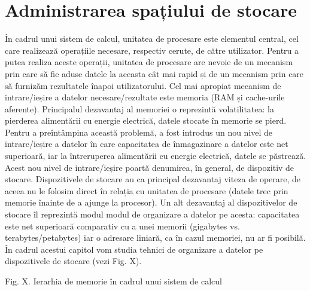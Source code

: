 \chapter{Administrarea spațiului de stocare}
\label{chapter:storage}

În cadrul unui sistem de calcul, unitatea de procesare este elementul central,
cel care realizează operațiile necesare, respectiv cerute, de către utilizator.
Pentru a putea realiza aceste operații, unitatea de procesare are nevoie de un
mecanism prin care să fie aduse datele la aceasta cât mai rapid și de un
mecanism prin care să furnizăm rezultatele înapoi utilizatorului. Cel mai
apropiat mecanism de intrare/ieșire a datelor necesare/rezultate este memoria
(RAM și cache-urile aferente). Principalul dezavantaj al memoriei o reprezintă
volatilitatea: la pierderea alimentării cu energie electrică, datele stocate în
memorie se pierd. Pentru a preîntâmpina această problemă, a fost introdus un nou
nivel de intrare/ieșire a datelor în care capacitatea de înmagazinare a datelor
este net superioară, iar la întreruperea alimentării cu energie electrică,
datele se păstrează. Acest nou nivel de intrare/ieșire poartă denumirea, în
general, de dispozitiv de stocare. Dispozitivele de stocare au ca principal
dezavantaj viteza de operare, de aceea nu le folosim direct în relația cu
unitatea de procesare (datele trec prin memorie înainte de a ajunge la
procesor). Un alt dezavantaj al dispozitivelor de stocare îl reprezintă modul
modul de organizare a datelor pe acesta: capacitatea este net superioară
comparativ cu a unei memorii (gigabytes vs. terabytes/petabytes) iar o adresare
liniară, ca în cazul memoriei, nu ar fi posibilă. În cadrul acestui capitol vom
studia tehnici de organizare a datelor pe dispozitivele de stocare (vezi Fig.
X).

Fig. X. Ierarhia de memorie în cadrul unui sistem de calcul


